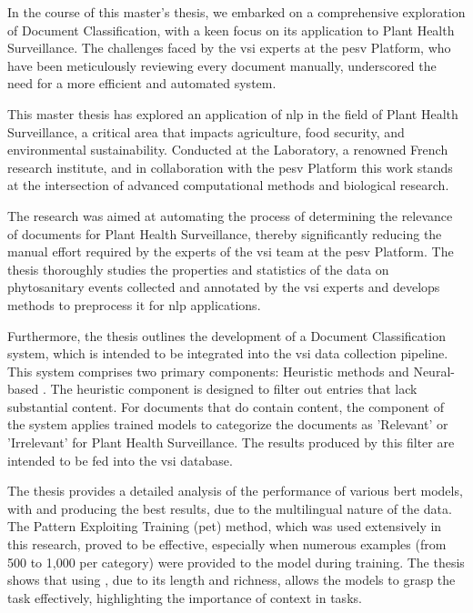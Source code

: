 \label{09_conclusion}


In the course of this master's thesis, we embarked on a comprehensive exploration of Document Classification, with a keen focus on its application to Plant Health Surveillance. The challenges faced by the \gls{vsi} experts at the \gls{pesv} Platform, who have been meticulously reviewing every document manually, underscored the need for a more efficient and automated system.




This master thesis has explored an application of \gls{nlp} in the field of Plant Health Surveillance, a critical area that impacts agriculture, food security, and environmental sustainability. Conducted at the \INRAE{} Laboratory, a renowned French research institute, and in collaboration with the \gls{pesv} Platform this work stands at the intersection of advanced computational methods and biological research.

The research was aimed at automating the process of determining the relevance of documents for Plant Health Surveillance, thereby significantly reducing the manual effort required by the experts of the \gls{vsi} team at the \gls{pesv} Platform. The thesis thoroughly studies the properties and statistics of the data on phytosanitary events collected and annotated by the \gls{vsi} experts and develops methods to preprocess it for \gls{nlp} applications.

Furthermore, the thesis outlines the development of a Document Classification system, which is intended to be integrated into the \gls{vsi} data collection pipeline. This system comprises two primary components: Heuristic methods and Neural-based \textclassification{}. 
The heuristic component is designed to filter out entries that lack substantial content. For documents that do contain content, the \textclassification{} component of the system applies trained models to categorize the documents as 'Relevant' or 'Irrelevant' for Plant Health Surveillance. The results produced by this filter are intended to be fed into the \gls{vsi} database.

The thesis provides a detailed analysis of the performance of various \gls{bert} models, with \bertmultilingual{} and \bertxlmroberta{} producing the best results, due to the multilingual nature of the data. The Pattern Exploiting Training (\gls{pet}) method, which was used extensively in this research, proved to be effective, especially when numerous examples (from 500 to 1,000 per category) were provided to the model during training. 
The thesis shows that using \trafilaturaFulltext{}, due to its length and richness, allows the models to grasp the task effectively, highlighting the importance of context in \textclassification{} tasks.

